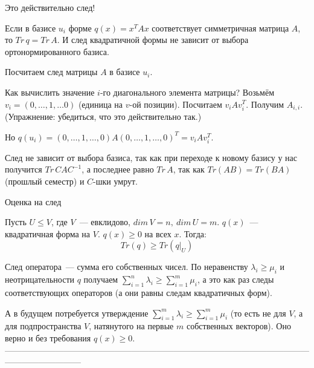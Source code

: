 \thrm Это действительно след!

Если в базисе $u_i$ форме $q(x)=x^TAx$ соответствует симметричная матрица $A$, то $Tr\,q=Tr\,A$. И след квадратичной формы не зависит от выбора ортонормированного базиса.

\proof

Посчитаем след матрицы $A$ в базисе $u_i$.

Как вычислить значение $i$-го диагонального элемента матрицы? Возьмём $v_i=(0,\ldots,1,\ldots 0)$ (единица на $v$-ой позиции). Посчитаем $v_iAv_i^T$. Получим $A_{i, i}$. (Упражнение: убедиться, что это действительно так.)

Но $q(u_i) = (0,\ldots,1,\ldots,0)A(0,\ldots,1,\ldots,0)^T = v_iAv_i^T$.

След не зависит от выбора базиса, так как при переходе к новому базису у нас получится $Tr\,CAC^{-1}$, а последнее равно $Tr\,A$, так как $Tr(AB)=Tr(BA)$ (прошлый семестр) и $C$-шки умрут.

\endproof
\ethrm

\thrm Оценка на след

Пусть $U\le V$, где $V$~--- евклидово, $dim\,V = n,\ dim\,U = m$. $q(x)$~--- квадратичная форма на $V$. $q(x)\ge 0$ на всех $x$. Тогда:
$$
Tr(q)\ge Tr(q|_U)
$$

\proof

След оператора~--- сумма его собственных чисел. По неравенству $\lambda_i\ge\mu_i$ и неотрицательности $q$ получаем $\sum\limits_{i=1}^n \lambda_i \ge \sum\limits_{i=1}^m \mu_i$, а это как раз следы соответствующих операторов (а они равны следам квадратичных форм).

\rem А в будущем потребуется утверждение $\sum\limits_{i = 1}^m \lambda_i \ge \sum\limits_{i = 1}^m \mu_i$ (то есть не для $V$, а для подпространства $V$, натянутого на первые $m$ собственных векторов). Оно верно и без требования $q(x)\ge 0$.
\endproof
\ethrm
---------------------------------------------------------------------------------------------------------------------------------------